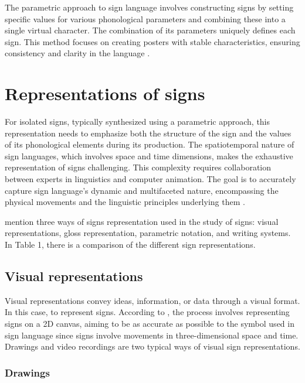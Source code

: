 The parametric approach to sign language involves constructing signs 
by setting specific values for various phonological parameters and 
combining these into a single virtual character. The combination of 
its parameters uniquely defines each sign. This method focuses on 
creating posters with stable characteristics, ensuring consistency and 
clarity in the language \parencite{naert2020survey}.




\section{Representations of signs}

 For isolated signs, typically synthesized using a parametric approach, this representation needs to emphasize both the structure of the sign and the values of its phonological elements during its production. The spatiotemporal nature of sign languages, which involves space and time dimensions, makes the exhaustive representation of signs challenging. This complexity requires collaboration between experts in linguistics and computer animation. The goal is to accurately capture sign language's dynamic and multifaceted nature, encompassing the physical movements and the linguistic principles underlying them \parencite{naert2020survey}.

 \textcite{naert2020survey} mention three ways of signs representation used in the study of signs: visual representations, gloss representation, parametric notation, and writing systems. In Table 1, there is a comparison of the different sign representations. 

 \subsection{Visual representations}

Visual representations convey ideas, information, or data through a visual format. In this case, to represent signs. According to \textcite{naert2020survey}, the process involves representing signs on a 2D canvas, aiming to be as accurate as possible to the symbol used in sign language since signs involve movements in three-dimensional space and time. Drawings and video recordings are two typical ways of visual sign representations.\\

\subsubsection{Drawings}

